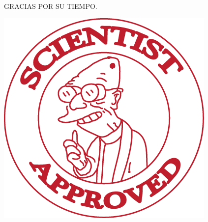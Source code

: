 \documentclass{beamer}
\begin{document}
\begin{frame}
	\begin{center}
		GRACIAS POR SU TIEMPO.
		
		\includegraphics{scientistapprovedfutura.png}
	\end{center}
\end{frame}
\end{document}
